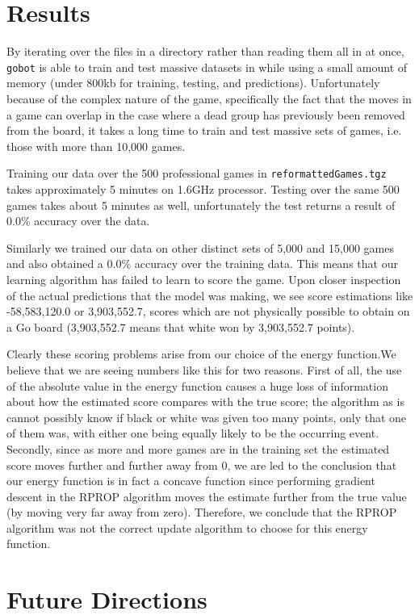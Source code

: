 \documentclass[11pt,letterpaper]{article}
\begin{document}
\section{Results}

By iterating over the files in a directory rather than reading them all in at once, {\tt gobot} is able to train and test
massive datasets in while using a small amount of memory (under 800kb for training, testing, and predictions).
Unfortunately because of the complex nature of the game, specifically the fact that the moves in a game can
overlap in the case where a dead group has previously been removed from the board, it takes a long time to train
and test massive sets of games, i.e. those with more than 10,000 games.

Training our data over the 500 professional games in
{\tt reformattedGames.tgz} takes approximately 5 minutes on 1.6GHz processor. Testing over the same 500 games
takes about 5 minutes as well, unfortunately the test returns a result of 0.0\% accuracy over the data.

Similarly we trained our data on other distinct sets of 5,000 and 15,000 games and also obtained a 0.0\% accuracy
over the training data. This means that our learning algorithm has failed to learn to score the game. Upon closer
inspection of the actual predictions that the model was making, we see score estimations like
-58,583,120.0 or 3,903,552.7, scores which are not physically possible to obtain on a Go board (3,903,552.7 means
that white won by 3,903,552.7 points).

Clearly these scoring problems arise from our choice of the energy function.We believe that we are seeing numbers
like this for two reasons. First of all, the use of the absolute value in the energy function causes a huge loss of
information about how the estimated score compares with the true score; the algorithm as is cannot possibly know if
black or white was given too many points, only that one of them was, with either one being equally likely to be the
occurring event. Secondly, since as more and more games are in the training set the estimated score moves further
and further away from 0, we are led to the conclusion that our energy function is in fact a concave function since
performing gradient descent in the RPROP algorithm moves the estimate further from the true value (by moving
very far away from zero). Therefore, we conclude that the RPROP algorithm was not the correct update algorithm to
choose for this energy function.

\section{Future Directions}
\end{document}
